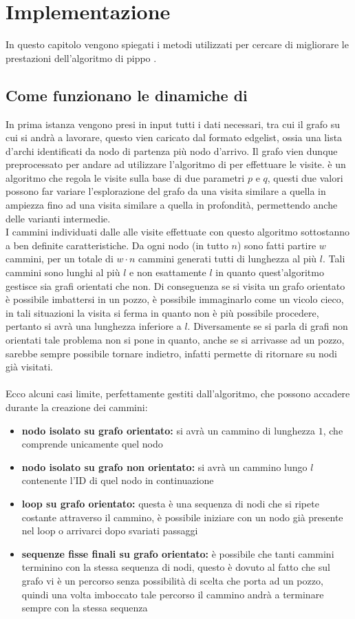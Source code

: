 %
%
%
\chapter{Implementazione}
In questo capitolo vengono spiegati i metodi utilizzati per cercare di migliorare le prestazioni dell'algoritmo di \cnrl pippo \cite{CNRL_code}.
%
\section{Come funzionano le dinamiche di \cnrl}
In prima istanza vengono presi in input tutti i dati necessari, tra cui il grafo su cui si andrà a lavorare, questo vien caricato dal formato edgelist, ossia una lista d'archi identificati da nodo di partenza più nodo d'arrivo. Il grafo vien dunque preprocessato per andare ad utilizzare l'algoritmo di \nv per effettuare le visite. \nv è un algoritmo che regola le visite sulla base di due parametri $p$ e $q$, questi due valori possono far variare l'esplorazione del grafo da una visita similare a quella in ampiezza fino ad una visita similare a quella in profondità, permettendo anche delle varianti intermedie.\\
I cammini individuati dalle alle visite effettuate con questo algoritmo sottostanno a ben definite caratteristiche. Da ogni nodo (in tutto $n$) sono fatti partire $w$ cammini, per un totale di $w \cdot n$ cammini generati tutti di lunghezza al più $l$. Tali cammini sono lunghi al più  $l$ e non esattamente $l$ in quanto quest'algoritmo gestisce sia grafi orientati che non. Di conseguenza se si visita un grafo orientato è possibile imbattersi in un pozzo, è possibile immaginarlo come un vicolo cieco, in tali situazioni la visita si ferma in quanto non è più possibile procedere, pertanto si avrà una lunghezza inferiore a $l$. Diversamente se si parla di grafi non orientati tale problema non si pone in quanto, anche se si arrivasse ad un pozzo, sarebbe sempre possibile tornare indietro, infatti \nv permette di ritornare su nodi già visitati.\\
\\
Ecco alcuni casi limite, perfettamente gestiti dall'algoritmo, che possono accadere durante la creazione dei cammini:
\begin{itemize}
	\item \textbf{nodo isolato su grafo orientato:} si avrà un cammino di lunghezza $1$, che comprende unicamente quel nodo
	\item \textbf{nodo isolato su grafo non orientato:} si avrà un cammino lungo $l$ contenente l'ID di quel nodo in continuazione
	\item \textbf{loop su grafo orientato:} questa è una sequenza di nodi che si ripete costante attraverso il cammino, è possibile iniziare con un nodo già presente nel loop o arrivarci dopo svariati passaggi
	\item \textbf{sequenze fisse finali su grafo orientato:} è possibile che tanti cammini terminino con la stessa sequenza di nodi, questo è dovuto al fatto che sul grafo vi è un percorso senza possibilità di scelta che porta ad un pozzo, quindi una volta imboccato tale percorso il cammino andrà a terminare sempre con la stessa sequenza
\end{itemize}
